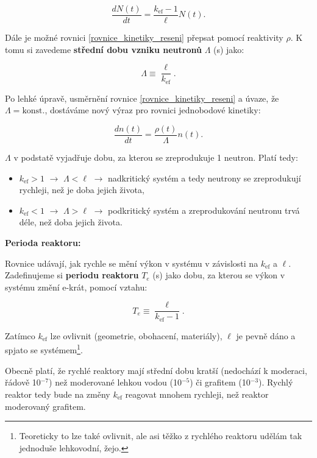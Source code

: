$$ \dfrac{dN(t)}{dt} = \dfrac{k_{\text{ef}} - 1}{\ell} N(t). $$

Dále je možné rovnici \eqref{rovnice_kinetiky_reseni} přepsat pomocí reaktivity $\rho$. K tomu si zavedeme \textbf{střední dobu vzniku neutronů} $\Lambda$ (s) jako:

\begin{equation}
  \boxed{
  \Lambda \equiv \dfrac{\ell}{k_{\text{ef}}}.
  \label{stredni_doba_vzniku}}
\end{equation}

Po lehké úpravě, usměrnění rovnice \eqref{rovnice_kinetiky_reseni} a úvaze, že $\Lambda = \text{konst.}$, dostáváme nový výraz pro rovnici jednobodové kinetiky:

\begin{equation}
  \boxed{
  \dfrac{dn(t)}{dt} = \dfrac{\rho (t)}{\Lambda} n(t).
  \label{rovnice_kinetiky_reaktivita}}
\end{equation}

$\Lambda$ v podstatě vyjadřuje dobu, za kterou se zreprodukuje 1 neutron. Platí tedy:

\begin{itemize}
  \item $k_{\text{ef}} > 1$ $\rightarrow$ $\Lambda < \ell$ $\rightarrow$ nadkritický systém a tedy neutrony se zreprodukují rychleji, než je doba jejich života,
  \item $k_{\text{ef}} < 1$ $\rightarrow$ $\Lambda > \ell$ $\rightarrow$ podkritický systém a zreprodukování neutronu trvá déle, než doba jejich života.
\end{itemize}

\textbf{Perioda reaktoru:}

Rovnice udávají, jak rychle se mění výkon v systému v závislosti na $k_{\text{ef}}$ a $\ell$. Zadefinujeme si \textbf{periodu reaktoru} $T_e$ (s) jako dobu, za kterou se výkon v systému změní e-krát, pomocí vztahu:

\begin{equation}
  \boxed{
  T_e \equiv \dfrac{\ell}{k_{\text{ef}} - 1}.
  \label{perioda}}
\end{equation}

Zatímco $k_{\text{ef}}$ lze ovlivnit (geometrie, obohacení, materiály), $\ell$ je pevně dáno a spjato se systémem\footnote{Teoreticky to lze také ovlivnit, ale asi těžko z rychlého reaktoru udělám tak jednoduše lehkovodní, žejo.}.

Obecně platí, že rychlé reaktory mají střední dobu kratší (nedochází k moderaci, řádově 10$^{-7}$) než moderované lehkou vodou (10$^{-5}$) či grafitem (10$^{-3}$). Rychlý reaktor tedy bude na změny $k_{\text{ef}}$ reagovat mnohem rychleji, než reaktor moderovaný grafitem.

